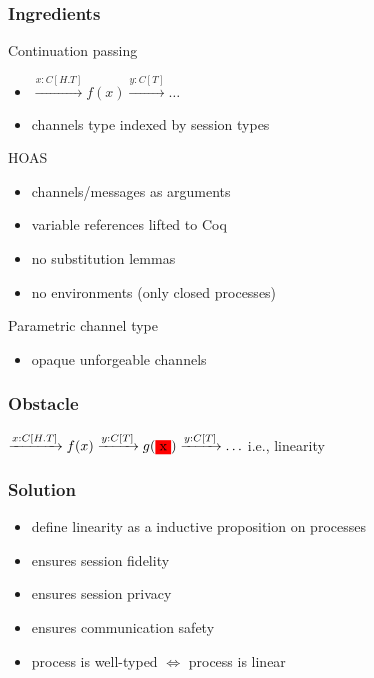 \documentclass{beamer}
\begin{document}
\begin{frame}
    \frametitle{Ingredients}
    \begin{block}{Continuation passing}
        \begin{itemize}
            \item $\xrightarrow{x : C[H.T]} f(x) \xrightarrow{y : C[T]} \ldots$
            \item channels type indexed by session types
        \end{itemize}
    \end{block}

    \begin{block}{HOAS}
        \begin{itemize}
            \item channels/messages as arguments
            \item variable references lifted to Coq
            \item no substitution lemmas
            \item no environments (only closed processes)
        \end{itemize}
    \end{block}

    \begin{block}{Parametric channel type}
        \begin{itemize}
            \item opaque unforgeable channels
        \end{itemize}
    \end{block}
\end{frame}

\begin{frame}
    \frametitle{Obstacle}
    \centering
    \LARGE
    $
    \xrightarrow{x : C[H.T]} f(x)
    \xrightarrow{y : C[T]} g(\colorbox{red}{x})
    \xrightarrow{y : C[T]} \ldots$
    \vfill
    i.e., linearity
\end{frame}

\begin{frame}
    \frametitle{Solution}
    \begin{itemize}
        \item define linearity as a inductive proposition on processes
        \item ensures session fidelity
        \item ensures session privacy
        \item ensures communication safety
        \item process is well-typed $\iff$ process is linear
    \end{itemize}
\end{frame}
\end{document}
